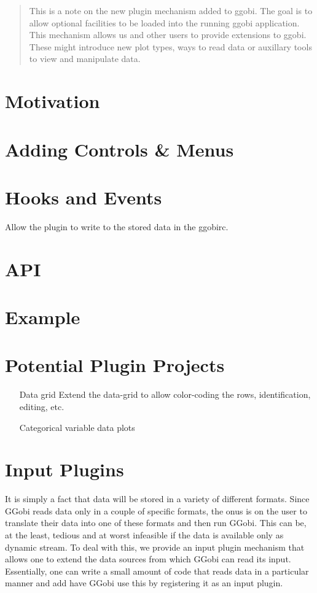 \documentclass{article}
\begin{document}
\begin{abstract}
  This is a note on the new plugin mechanism added to ggobi. The goal
  is to allow optional facilities to be loaded into the running ggobi
  application.
 This mechanism allows us and other users to provide extensions
 to ggobi. These  might introduce new plot types, ways
 to read data or auxillary tools to view and manipulate
 data.

\end{abstract}

\section{Motivation}

\section{Adding Controls \& Menus}

\section{Hooks and Events}
Allow the plugin to write to the stored data
in the ggobirc.

\section{API}

\section{Example}


\section{Potential Plugin Projects}

\begin{itemize}

\item[Data grid]
Extend the data-grid to 
allow color-coding the rows, identification,
editing, etc.

\item[Categorical variable data plots]

\end{itemize}

\section{Input Plugins}
It is simply a fact that data will be stored in a variety of different
formats. Since GGobi reads data only in a couple of specific formats,
the onus is on the user to translate their data into one of these
formats and then run GGobi. This can be, at the least, tedious and at
worst infeasible if the data is available only as dynamic stream.  To
deal with this, we provide an input plugin mechanism that allows one
to extend the data sources from which GGobi can read its input.
Essentially, one can write a small amount of code that reads
data in a particular manner and add have GGobi use this 
by registering it as an input plugin.
\end{document}
